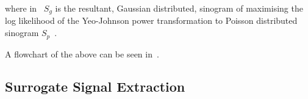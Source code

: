                 \noindent where in~ $S_g$ is the resultant, Gaussian distributed, sinogram of maximising the log likelihood of the Yeo-Johnson power transformation to Poisson distributed sinogram $S_p$~.
                
                A flowchart of the above can be seen in~.
            
            \subsection{Surrogate Signal Extraction} \label{sec:pca_data_driven_surrogate_signal_extraction_methods_for_dynamic_pet_methods_surrogate_signal_extraction}
